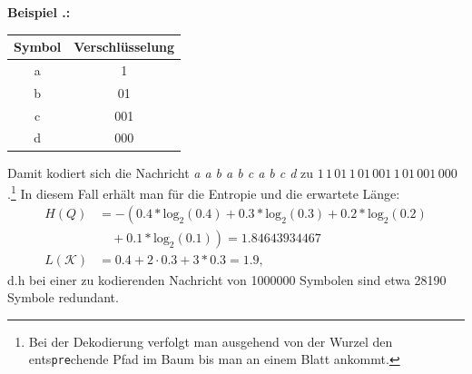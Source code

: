 \documentclass[a4paper,12pt]{article}
\newcounter{Beispiel}
\newenvironment{Beispiel}{
\medskip
        
        \setlength{\parindent}{0pt}
        \addtocounter{Beispiel}{1}
        \textbf{\textsf{Beispiel \thesubsection.\theBeispiel}:}\\}{
        \nopagebreak
        \vspace{-1.0ex}
        \bigskip
        
}
\begin{document}
\begin{Beispiel}
\begin{minipage}[h]{.5\textwidth}
\begin{tabular}{c|c}
Symbol & Verschlüsselung
\\
\hline
a & 1
\\
\hline
b & 01
\\
\hline
c & 001
\\
\hline
d & 000
\end{tabular}
\vspace{3cm}
\end{minipage}
\hfill
 \begin{minipage}[h]{.5\textwidth}
\begin{flushright}
\end{flushright}
\hspace{1.5cm} 
\end{minipage} 
Damit kodiert sich die Nachricht {\it a 	a 	b 	a 	b 	c 	a 	b 	c 	d} zu
$1\, 	1\, 	01\, 	1\, 	01\, 	001\, 	1\, 	01\, 	001\, 	000$.\footnote{\footnotesize{Bei der Dekodierung verfolgt man ausgehend von der Wurzel den ents{\tt{pre}}chende Pfad im Baum bis man an einem Blatt ankommt.}}   
In diesem Fall erhält man für die Entropie und die erwartete Länge:
\begin{align*}
H(Q) &=-\left(  0.4 * \text{log}_{2}(0.4)   +   0.3 * \text{log}_{2}(0.3) +  0.2 * \text{log}_{2}(0.2)\right.\\
     &\left.\quad +  0.1 * \text{log}_{2}(0.1)\right) = 1.84643934467
\\
L(\mathcal{K})&= 0.4 + 2\cdot 0.3 + 3* 0.3 = 1.9,
\end{align*}
d.h bei einer zu kodierenden Nachricht von 1000000 Symbolen sind etwa 28190 Symbole redundant.
\end{Beispiel}
\end{document}

